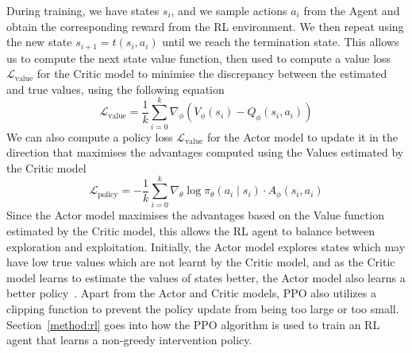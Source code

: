 During training, we have states $s_i$, 
and we sample actions $a_i$ from the Agent
and obtain the corresponding reward
from the RL environment.
We then repeat using the new state $s_{i+1} = t(s_i, a_i)$ until we reach the termination state.
This allows us to compute 
the next state value function,
then used to compute a value loss $\mathcal{L}_{\text{value}}$ for the Critic model
to minimise the discrepancy between the estimated and true
values, using the following equation
\begin{equation}\label{equation:value-loss}
\mathcal{L}_{\text{value}} = \frac{1}{k} \sum_{i=0}^k 
\nabla_\phi (V_\phi(s_i) - Q_\phi(s_i,a_i))
\end{equation}
We can also compute a policy loss $\mathcal{L}_{\text{value}}$ for the Actor model
to update it in the direction that maximises the advantages
computed using the Values estimated by the Critic model
\begin{equation}\label{equation:policy-loss}
\mathcal{L}_{\text{policy}} = -\frac{1}{k} \sum_{i = 0}^k \nabla_\theta \log
 \pi_\theta(a_i \mid s_i) \cdot A_\phi(s_i, a_i)
 \end{equation}
Since the Actor model
maximises the advantages based on the Value function
estimated by the Critic model,
this allows the 
RL agent to balance between exploration and exploitation.
Initially, the Actor model explores states which may have low true values
which are not learnt by the Critic model, and as the Critic model
learns to estimate the values of states better, the Actor model also 
learns a better policy~\cite{ppo}. Apart from the Actor and Critic models,
PPO also utilizes
a clipping function to prevent the policy update 
from being too large or too small.
Section~\ref{method:rl} goes into how
the PPO algorithm is used to train an RL agent that learns 
a non-greedy intervention policy.
 

